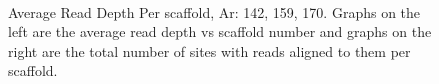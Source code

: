 \documentclass[../main.tex]{subfiles}
\begin{document}
\begin{figure}[H]
\begin{centering}
		\\
		\begin{singlespace}
			\vspace{-0.5cm}
			\caption[Average Read Depth Per scaffold, Ar: 142, 159, 170]{Average Read Depth Per scaffold, Ar: 142, 159, 170. Graphs on the left are the average read depth vs scaffold number and graphs on the right are the total number of sites with reads aligned to them per scaffold.}\label{avg_rd_graphs_2}
		\end{singlespace}
	\end{centering}
\end{figure}
\end{document}
